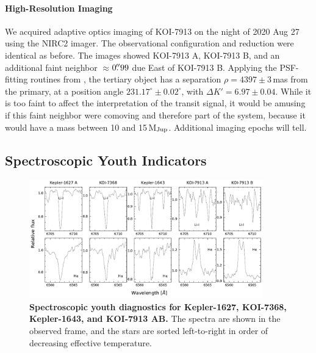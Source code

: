 \documentclass[12pt,twocolumn,tighten,linenumbers]{aastex63}
\begin{document}
\paragraph{High-Resolution Imaging}
We acquired adaptive optics imaging of KOI-7913 on the night of 2020
Aug 27 using the NIRC2 imager.  The observational configuration and
reduction were identical as before.  The images showed KOI-7913 A,
KOI-7913 B, and an additional faint neighbor $\approx$$0\mbox{$.\!\!^{\prime\prime}$}99$ due East
of KOI-7913 B.  Applying the PSF-fitting routines from
\citet{kraus_impact_2016}, the tertiary object has a separation $\rho =
4397 \pm 3$\,mas from the primary, at a position angle $231.17^\circ
\pm 0.02^\circ$, with $\Delta K' = 6.97 \pm 0.04$.  While it is too
faint to affect the interpretation of the transit signal, it would be
amusing if this faint neighbor were comoving and therefore part of the system, 
because it would have a mass between 10 and
15\,M$_{\rm Jup}$.  Additional imaging epochs will tell.


\subsection{Spectroscopic Youth Indicators}
\label{subsec:specyouth}

\begin{figure}[t]
	\begin{center}
		\leavevmode
			\includegraphics[width=0.9\textwidth]{f5.pdf}
	\end{center}
	\vspace{-0.5cm}
	\caption{
    {\bf Spectroscopic youth diagnostics for Kepler-1627, KOI-7368,
    Kepler-1643, and KOI-7913 AB. }
    The spectra are shown in the observed frame, and the stars are
    sorted left-to-right in order of decreasing effective temperature.
    \label{fig:koiyouthindicators}
	}
\end{figure}
\end{document}
